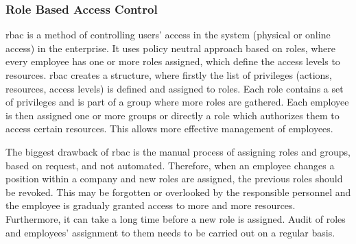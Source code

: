 \subsubsection{Role Based Access Control} \label{sec:sota-rbac}

\acrfull{rbac} is a method of controlling users' access in the system (physical or online access) in the enterprise. It uses policy neutral approach based on roles, where every employee has one or more roles assigned, which define the access levels to resources. 
\acrshort{rbac} creates a structure, where firstly the list of privileges (actions, resources, access levels) is defined and assigned to roles. Each role contains a set of privileges and is part of a group where more roles are gathered. Each employee is then assigned one or more groups or directly a role which authorizes them to access certain resources. This allows more effective management of employees.~\cite{Sandhu1996Role-basedModels}

The biggest drawback of \acrshort{rbac} is the manual process of assigning roles and groups, based on request, and not automated. Therefore, when an employee changes a position within a company and new roles are assigned, the previous roles should be revoked. This may be forgotten or overlooked by the responsible personnel and the employee is gradualy granted access to more and more resources. Furthermore, it can take a long time before a new role is assigned. Audit of roles and employees’ assignment to them needs to be carried out on a regular basis.

